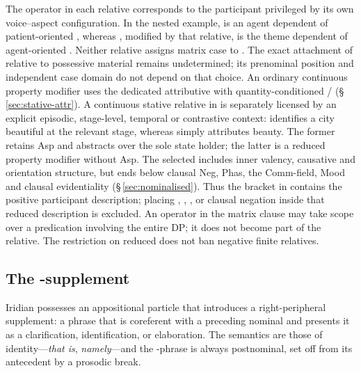 \pex
\a {} 
\a {}
\xe

The operator in each relative corresponds to the participant privileged by its
own voice--aspect configuration. In the nested example,  is an
agent dependent of patient-oriented , whereas ,
modified by that relative, is the theme dependent of agent-oriented
. Neither relative assigns matrix case to .
The exact attachment of  relative to possessive material remains
undetermined; its prenominal position and independent case domain do not depend
on that choice. An ordinary continuous property modifier uses the dedicated
attributive with quantity-conditioned /
(§\,\ref{sec:stative-attr}). A continuous stative relative in 
is separately licensed by an explicit episodic, stage-level, temporal or
contrastive context:  identifies a city beautiful at the
relevant stage, whereas  simply attributes beauty. The former
retains Asp and abstracts over the sole state holder; the latter is a reduced
property modifier without Asp. The
selected  includes inner valency, causative and orientation
structure, but ends below clausal Neg, Phas, the Comm-field, Mood and clausal
evidentiality (§\,\ref{sec:nominalised}). Thus the bracket in
 contains the positive participant description;
placing , , ,  or clausal negation
inside that reduced description is excluded. An operator in the matrix clause
may take scope over a predication involving the entire DP; it does not become
part of the relative. The restriction on reduced  does not ban
negative finite relatives.

\subsection{The -supplement}
\label{sec:nm-appos}

Iridian possesses an appositional particle  that introduces a
right-peripheral supplement: a phrase that is coreferent with a preceding
nominal and presents it as a clarification, identification, or elaboration. The
semantics are those of identity---\textit{that is}, \textit{namely}---and the
-phrase is always postnominal, set off from its antecedent by a prosodic
break.

